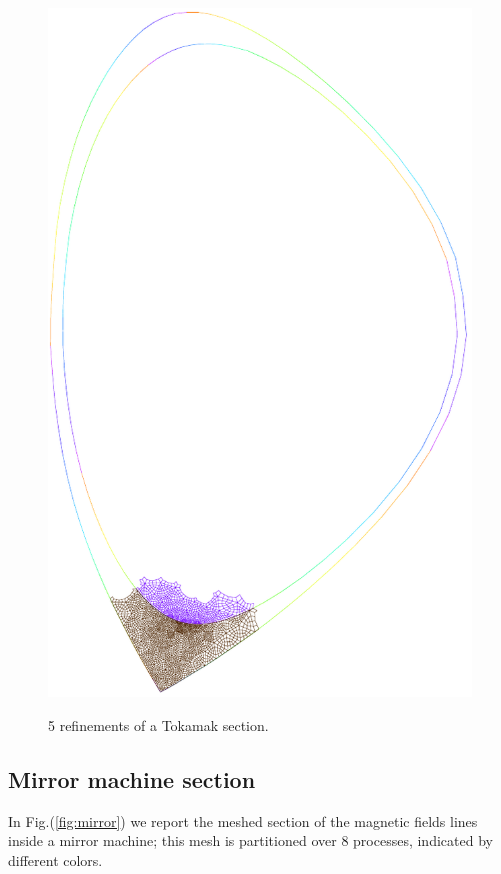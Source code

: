 \begin{figure}
{\includegraphics[scale=.5]{images/tokamak_layer_mesh_adapt_fine_3_ref.pdf}}\quad
\caption{5 refinements of a Tokamak section.}\label{fig:refinement}
\end{figure}
\newpage

\subsection{Mirror machine section}\label{subsection:mirror_machine}
In Fig.(\ref{fig:mirror}) we report the meshed section of the magnetic fields lines inside a mirror machine; this mesh is partitioned over 8 processes, indicated by different colors.

